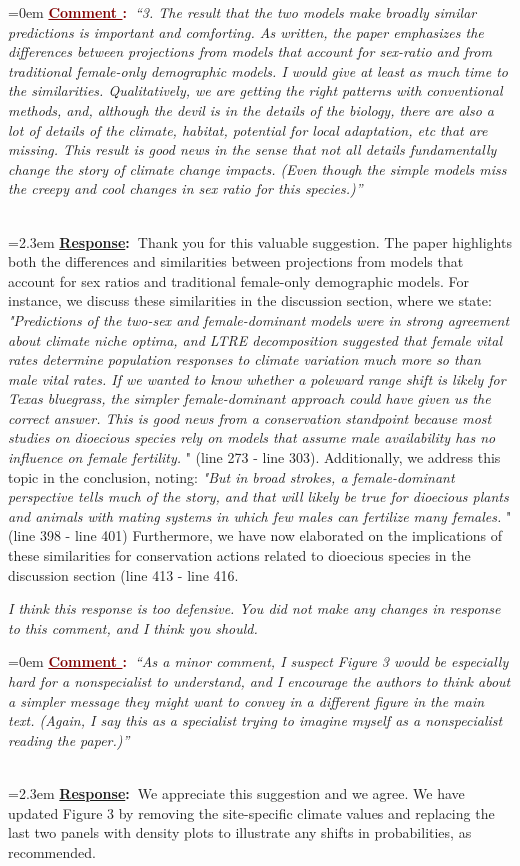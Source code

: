 \documentclass[12pt]{article}
\newcounter{cN}
\newcommand{\comment}[1]{
	\vspace{2em}
	\refstepcounter{cN} %
	\noindent \hangindent=0em \textbf{\textcolor{Maroon}{\uline{Comment \thecN}:~}}\emph{``#1''}
	}
\newcommand{\response}[1]{
	\\[0.25em]
	\hangindent=2.3em \textbf{\textcolor{NavyBlue}{\uline{Response}:~}}#1
	}
\begin{document}
\comment{3. The result that the two models make broadly similar predictions is important and comforting. As written, the paper emphasizes the differences between projections from models that account for sex-ratio and from traditional female-only demographic models. I would give at least as much time to the similarities. Qualitatively, we are getting the right patterns with conventional methods, and, although the devil is in the details of the biology, there are also a lot of details of the climate, habitat, potential for local adaptation, etc that are missing. This result is good news in the sense that not all details fundamentally change the story of climate change impacts. (Even though the simple models miss the creepy and cool changes in sex ratio for this species.)}
\response{Thank you for this valuable suggestion.
 The paper highlights both the differences and similarities between projections from models that account for sex ratios and traditional female-only demographic models. 
 For instance, we discuss these similarities in the discussion section, where we state: \emph{"Predictions of the two-sex and female-dominant models were in strong agreement about climate niche optima, and LTRE decomposition suggested that female vital rates determine population responses to climate variation much more so than male vital rates. 
If we wanted to know whether a poleward range shift is likely for Texas bluegrass, the simpler female-dominant approach could have given us the correct answer. 
This is good news from a conservation standpoint because most studies on dioecious species rely on models that assume male availability has no influence on female fertility.
} " (line 273 - line 303). 
 Additionally, we address this topic in the conclusion, noting:\emph{ "But in broad strokes, a female-dominant perspective tells much of the story, and that will likely be true for dioecious plants and animals with mating systems in which few males can fertilize many females.} " (line 398 - line 401)
Furthermore, we have now elaborated on the implications of these similarities for conservation actions related to dioecious species in the discussion section (line 413 - line 416.

\textit{I think this response is too defensive. You did not make any changes in response to this comment, and I think you should.}}

\comment{As a minor comment, I suspect Figure 3 would be especially hard for a nonspecialist to understand, and I encourage the authors to think about a simpler message they might want to convey in a different figure in the main text. (Again, I say this as a specialist trying to imagine myself as a nonspecialist reading the paper.)}
\response{We appreciate this suggestion and we agree. 
We have updated Figure 3 by removing the site-specific climate values and replacing the last two panels with density plots to illustrate any shifts in probabilities, as  recommended.}


\end{document}
